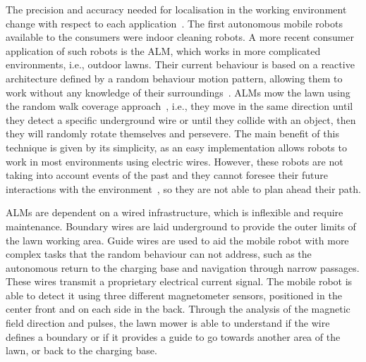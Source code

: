 

The precision and accuracy needed for localisation in the working environment change with respect to each application~\cite{autonomous-yasuda}.
The first autonomous mobile robots available to the consumers were indoor cleaning robots. 
A more recent consumer application of such robots is the \gls{ALM}, which works in more complicated environments, i.e., outdoor lawns.
Their current behaviour is based on a reactive architecture defined by a random behaviour motion pattern, allowing them to work without any knowledge of their surroundings~\cite{wooldridge_agent_1995}.
\glspl{ALM} mow the lawn using the random walk coverage approach~\cite{karol_ardic_conditional_2016}, i.e., they move in the same direction until they detect a specific underground wire or until they collide with an object, then they will randomly rotate themselves and persevere.
The main benefit of this technique is given by its simplicity, as an easy implementation allows robots to work in most environments using electric wires. 
However, these robots are not taking into account events of the past and they cannot foresee their future interactions with the environment~\cite{muller_1999}, so they are not able to plan ahead their path.






\glspl{ALM} are dependent on a wired infrastructure, which is inflexible and require maintenance.
Boundary wires are laid underground to provide the outer limits of the lawn working area. Guide wires are used to aid the mobile robot with more complex tasks that the random behaviour can not address, such as the autonomous return to the charging base and navigation through narrow passages.
These wires transmit a proprietary electrical current signal. The mobile robot is able to detect it using three different magnetometer sensors, positioned in the center front and on each side in the back.
Through the analysis of the magnetic field direction and pulses, the lawn mower is able to understand if the wire defines a boundary or if it provides a guide to go towards another area of the lawn, or back to the charging base.

